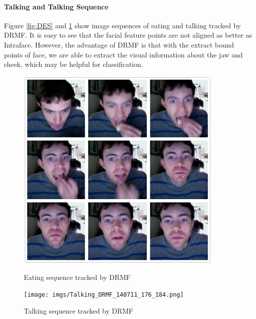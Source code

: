 \paragraph{Talking and Talking Sequence}
Figure \ref{fig:DES} and \ref{fig:DTS} show image sequences of eating and talking tracked by DRMF. It is easy to see that the facial feature points are not aligned as better as Intraface. However, the advantage of DRMF is that with the extract bound points of face, we are able to extract the visual information about the jaw and cheek, which may be helpful for classification.
\newpage
\begin{figure}[p]
\centering
\includegraphics[width=100mm]{imgs/Tracking_DRMF_eating.png}
\caption{Eating sequence tracked by DRMF}
\label{fig:DES}
\texttt{[image: imgs/Talking\_DRMF\_140711\_176\_184.png]}
\caption{Talking sequence tracked by DRMF}
\label{fig:DTS}
\end{figure}
\newpage
